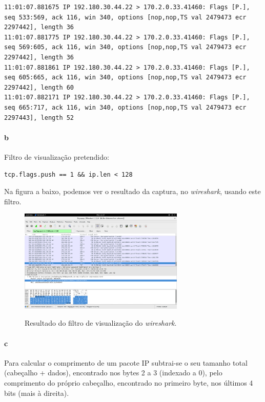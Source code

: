 \begin{verbatim}
11:01:07.881675 IP 192.180.30.44.22 > 170.2.0.33.41460: Flags [P.], seq 533:569, ack 116, win 340, options [nop,nop,TS val 2479473 ecr 2297442], length 36
11:01:07.881775 IP 192.180.30.44.22 > 170.2.0.33.41460: Flags [P.], seq 569:605, ack 116, win 340, options [nop,nop,TS val 2479473 ecr 2297442], length 36
11:01:07.881861 IP 192.180.30.44.22 > 170.2.0.33.41460: Flags [P.], seq 605:665, ack 116, win 340, options [nop,nop,TS val 2479473 ecr 2297442], length 60
11:01:07.882171 IP 192.180.30.44.22 > 170.2.0.33.41460: Flags [P.], seq 665:717, ack 116, win 340, options [nop,nop,TS val 2479473 ecr 2297443], length 52
\end{verbatim}

\paragraph{b}
Filtro de visualização pretendido:
\begin{verbatim}
tcp.flags.push == 1 && ip.len < 128
\end{verbatim}
Na figura a baixo, podemos ver o resultado da captura, no \emph{wireshark}, usando este filtro.

\begin{figure}[h]
\centering
\includegraphics[width=0.7\textwidth]{3_b_screenshot.png}
\label{fig:wireshark}
\caption{Resultado do filtro de visualização do \emph{wireshark}.}
\end{figure}

\paragraph{c}
Para calcular o comprimento de um pacote IP subtrai-se o seu tamanho total (cabeçalho + dados), encontrado nos bytes 2 a 3 (indexado a 0), pelo comprimento do próprio cabeçalho, encontrado no primeiro byte, nos últimos 4 bits (mais à direita).